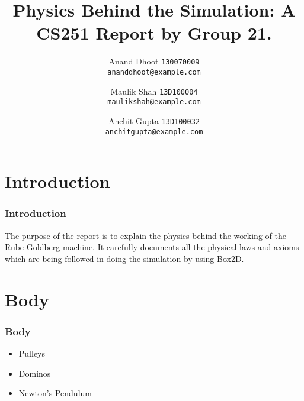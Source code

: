 \author
{
	Anand Dhoot 
	\texttt{130070009\\ananddhoot@example.com}\\
	\and
	Maulik Shah 
	\texttt{13D100004\\maulikshah@example.com}\\
	\and
	Anchit Gupta 
	\texttt{13D100032\\anchitgupta@example.com}
}
\title{Physics Behind the Simulation: A CS251 Report by Group 21.}

\maketitle



\section{Introduction}
\begin{frame}
	\frametitle{Introduction}
	The purpose of the report is to explain the physics behind the working of the Rube Goldberg machine. It carefully documents all the physical laws and axioms which are being followed in doing the simulation by using Box2D.
\end{frame}

\section{Body}
\begin{frame}
	\frametitle{Body}
\begin{itemize}
\item Pulleys
\item Dominos
\item Newton's Pendulum
\end{itemize}
\end{frame}


